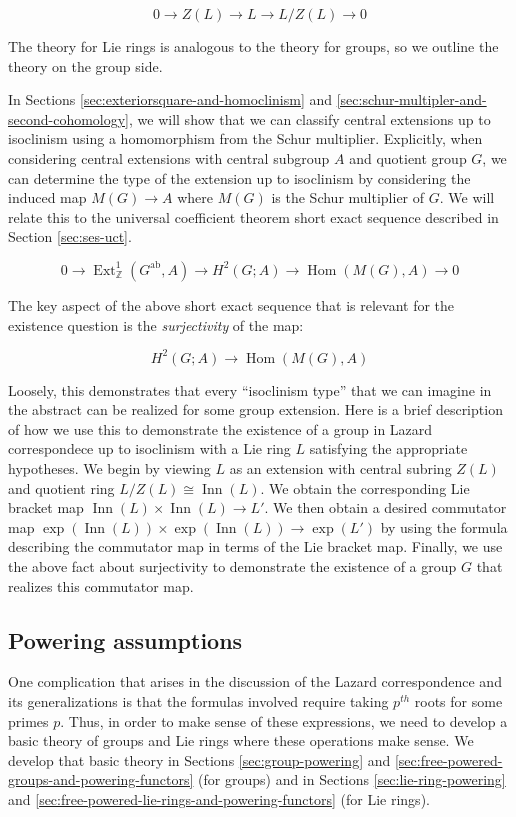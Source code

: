 \documentclass{ucetd}
\begin{document}
$$0 \to Z(L) \to L \to L/Z(L) \to 0$$

The theory for Lie rings is analogous to the theory for groups, so we
outline the theory on the group side.

In Sections \ref{sec:exteriorsquare-and-homoclinism} and
\ref{sec:schur-multipler-and-second-cohomology}, we will show that we
can classify central extensions up to isoclinism using a homomorphism
from the Schur multiplier. Explicitly, when considering central
extensions with central subgroup $A$ and quotient group $G$, we can
determine the type of the extension up to isoclinism by considering
the induced map $M(G) \to A$ where $M(G)$ is the Schur multiplier of
$G$. We will relate this to the universal coefficient theorem short
exact sequence described in Section \ref{sec:ses-uct}.

\begin{equation*}
  0 \to \operatorname{Ext}^1_{\mathbb{Z}}(G^{\operatorname{ab}},A) \to H^2(G;A) \to \operatorname{Hom}(M(G),A) \to 0
\end{equation*}

The key aspect of the above short exact sequence that is relevant for
the existence question is the {\em surjectivity} of the map:

$$H^2(G;A) \to \operatorname{Hom}(M(G),A)$$

Loosely, this demonstrates that every ``isoclinism type'' that we can
imagine in the abstract can be realized for some group extension. Here
is a brief description of how we use this to demonstrate the existence
of a group in Lazard correspondece up to isoclinism with a Lie ring
$L$ satisfying the appropriate hypotheses. We begin by viewing $L$ as
an extension with central subring $Z(L)$ and quotient ring $L/Z(L)
\cong \operatorname{Inn}(L)$. We obtain the corresponding Lie bracket
map $\operatorname{Inn}(L) \times \operatorname{Inn}(L) \to L'$. We
then obtain a desired commutator map $\exp(\operatorname{Inn}(L))
\times \exp(\operatorname{Inn}(L)) \to \exp(L')$ by using the formula
describing the commutator map in terms of the Lie bracket
map. Finally, we use the above fact about surjectivity to demonstrate
the existence of a group $G$ that realizes this commutator map.

\subsection{Powering assumptions}

One complication that arises in the discussion of the Lazard
correspondence and its generalizations is that the formulas involved
require taking $p^{th}$ roots for some primes $p$. Thus, in order to
make sense of these expressions, we need to develop a basic theory of
groups and Lie rings where these operations make sense. We develop
that basic theory in Sections \ref{sec:group-powering} and
\ref{sec:free-powered-groups-and-powering-functors} (for groups) and
in Sections \ref{sec:lie-ring-powering} and
\ref{sec:free-powered-lie-rings-and-powering-functors} (for Lie
rings).
\end{document}
